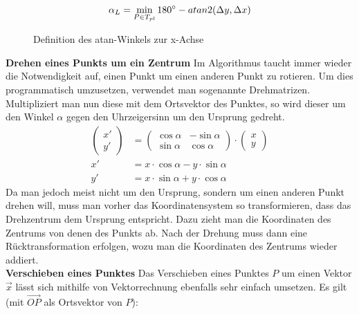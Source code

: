 \documentclass[a4paper, notitlepage, 12pt,headinclude]{scrartcl}
\begin{document}
\begin{equation}
\alpha_L = \min_{P \in T_{pl}} 180\degree - atan2(\Delta y, \Delta x)
\end{equation}
\begin{figure}[H]
	\centering {}
	\caption{Definition des atan-Winkels zur x-Achse}
\end{figure}
\textbf{Drehen eines Punkts um ein Zentrum} \quad Im Algorithmus taucht immer wieder die Notwendigkeit auf, einen Punkt um einen anderen Punkt zu rotieren. Um dies programmatisch umzusetzen, verwendet man sogenannte Drehmatrizen.\cite{Src:dreh} Multipliziert man nun diese mit dem Ortsvektor des Punktes, so wird dieser um den Winkel $\alpha$ gegen den Uhrzeigersinn um den Ursprung gedreht.
\begin{align}
\begin{pmatrix} x' \\ y' \end{pmatrix} &= \begin{pmatrix} \cos\alpha & -\sin\alpha \\ \sin\alpha & \cos\alpha\end{pmatrix} \cdot \begin{pmatrix} x \\y \end{pmatrix} \\
x' &= x \cdot \cos \alpha - y \cdot \sin \alpha \\
y' &= x \cdot \sin \alpha + y \cdot \cos \alpha
\end{align}
Da man jedoch meist nicht um den Ursprung, sondern um einen anderen Punkt drehen will, muss man vorher das Koordinatensystem so transformieren, dass das Drehzentrum dem Ursprung entspricht. Dazu zieht man die Koordinaten des Zentrums von denen des Punkts ab. Nach der Drehung muss dann eine Rücktransformation erfolgen, wozu man die Koordinaten des Zentrums wieder addiert. \\
\textbf{Verschieben eines Punktes} \quad Das Verschieben eines Punktes $P$ um einen Vektor $\vec{x}$ lässt sich mithilfe von Vektorrechnung ebenfalls sehr einfach umsetzen. Es gilt (mit $\overrightarrow{OP}$ als Ortsvektor von $P$):
\end{document}
